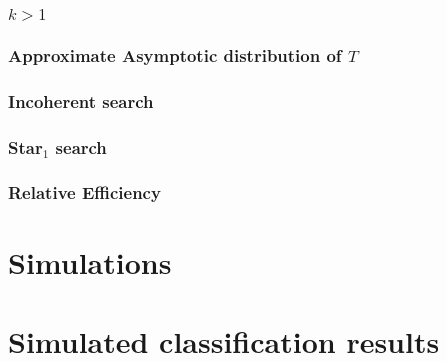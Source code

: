 

\subsubsection{$k>1$} %
\label{par:_k_1_}



\subsubsection{Approximate Asymptotic distribution of $T$} %
\label{ssub:approximate_asymptotica_distribution_of_t_}

\subsubsection{Incoherent search} %
\label{par:incoherent_search}



\subsubsection{Star$_1$ search} %
\label{par:star__1_search}




\subsubsection{Relative Efficiency} %
\label{ssub:relative_efficiency}




\section{Simulations} %
\label{sec:simulation}




\section{Simulated classification results} %
\label{sub:classification_results}



